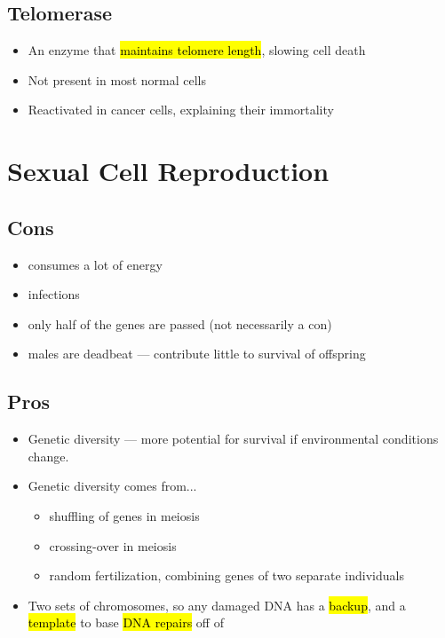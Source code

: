 \documentclass[a4paper,12pt]{article}
\begin{document}
\subsection{Telomerase}
\begin{itemize}
    \item{An enzyme that \hl{maintains telomere length}, slowing cell death}
    \item{Not present in most normal cells}
    \item{Reactivated in cancer cells, explaining their immortality}
\end{itemize}

\pagebreak

\section{Sexual Cell Reproduction}

\subsection{Cons}
\begin{itemize}
    \item{consumes a lot of energy}
    \item{infections}
    \item{only half of the genes are passed (not necessarily a con)}
    \item{males are deadbeat --- contribute little to survival of offspring}
\end{itemize}

\subsection{Pros}
\begin{itemize}
    \item{Genetic diversity --- more potential for survival if environmental conditions change.}
    \item{
            Genetic diversity comes from...
            \begin{itemize}
                \item{shuffling of genes in meiosis}
                \item{crossing-over in meiosis}
                \item{random fertilization, combining genes of two separate individuals}
            \end{itemize}
        }
    \item{Two sets of chromosomes, so any damaged DNA has a \hl{backup}, and a \hl{template} to base \hl{DNA repairs} off of}
\end{itemize}
\end{document}
